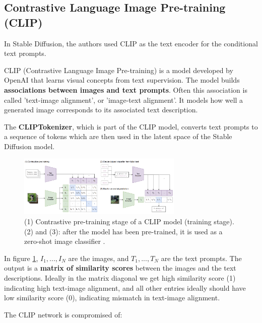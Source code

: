 \subsection{Contrastive Language Image Pre-training (CLIP)}
\label{subsec:clip}

In Stable Diffusion, the authors used CLIP as the text encoder for the conditional text prompts.

CLIP (Contrastive Language Image Pre-training) \cite{openai_clip} is a model developed by OpenAI that learns visual concepts from text supervision. The model builds \textbf{associations between images and text prompts}. Often this association is called 'text-image alignment', or 'image-text alignment'. It models how well a generated image corresponds to its associated text description.

The \textbf{CLIPTokenizer}, which is part of the CLIP model, converts text prompts to a sequence of tokens which are then used in the latent space of the Stable Diffusion model.

\begin{figure}
    \centering
    \includegraphics[width=0.7\textwidth]{images/diffusion_models/stable_diffusion/clip.png}
    \caption{(1) Contrastive pre-training stage of a CLIP model (training stage). (2) and (3): after the model has been pre-trained, it is used as a zero-shot image classifier \cite{openai_clip}.}
    \label{fig:openai_clip}
\end{figure}

In figure \ref{fig:openai_clip},  $I_1, ..., I_N$ are the images, and $T_1, ..., T_N$ are the text prompts. The output is a \textbf{matrix of similarity scores} between the images and the text descriptions. Ideally in the matrix diagonal we get high similarity score (1) indicating high text-image alignment, and all other entries ideally should have low similarity score (0), indicating mismatch in text-image alignment.

The CLIP network is compromised of:

